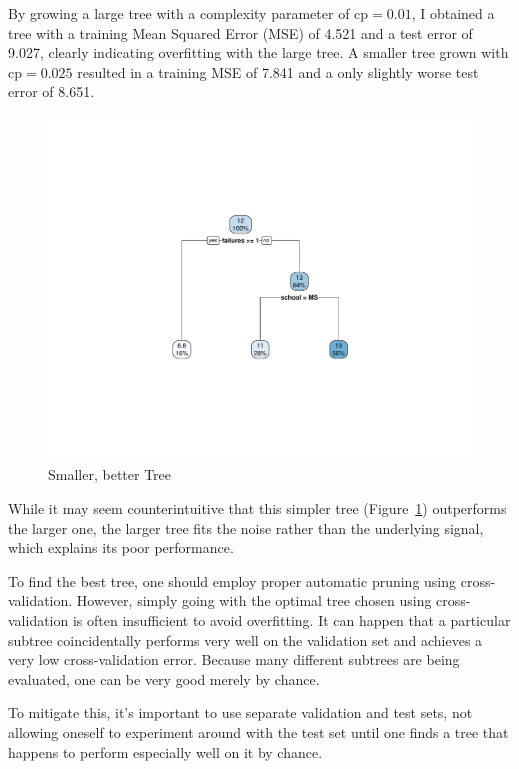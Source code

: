 \documentclass[12pt]{article}
\begin{document}
By growing a large tree with a complexity parameter of \( \text{cp} = 0.01 \), I obtained a tree with a training Mean Squared Error (MSE) of 4.521 and a test error of 9.027, clearly indicating overfitting with the large tree. A smaller tree grown with \( \text{cp} = 0.025 \) resulted in a training MSE of 7.841 and a only slightly worse test error of 8.651.

\begin{figure}
    \centering
    \includegraphics[scale=0.30]{small_manual_tree.pdf}
    \caption{Smaller, better Tree}
    \label{small_tree}
\end{figure}

While it may seem counterintuitive that this simpler tree (Figure~\ref{small_tree}) outperforms the larger one, the larger tree fits the noise rather than the underlying signal, which explains its poor performance.

To find the best tree, one should employ proper automatic pruning using cross-validation. However, simply going with the optimal tree chosen using cross-validation is often insufficient to avoid overfitting. It can happen that a particular subtree coincidentally performs very well on the validation set and achieves a very low cross-validation error. Because many different subtrees are being evaluated, one can be very good merely by chance.

To mitigate this, it's important to use separate validation and test sets, not allowing oneself to experiment around with the test set until one finds a tree that happens to perform especially well on it by chance.
\end{document}
